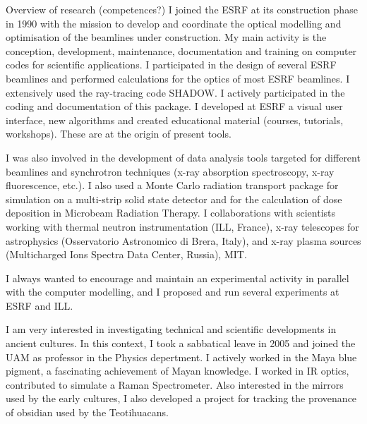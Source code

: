 \begin{rubric}{Overview of research (competences?)}
I joined the ESRF at its construction phase in 1990 with the mission to develop and coordinate the optical modelling and optimisation of the beamlines under construction.
My main activity is the conception, development, maintenance, documentation and training on
computer codes for scientific applications. I participated in the design of several ESRF beamlines and performed calculations for the optics of most ESRF beamlines.
I extensively used the ray-tracing code SHADOW. I actively participated in the coding and
documentation of this package. I developed at ESRF a visual user interface, new algorithms and
created educational material (courses, tutorials, workshops). These are at the origin of present tools.

I was also involved in the development of data analysis tools targeted for different beamlines and
synchrotron techniques (x-ray absorption spectroscopy, x-ray fluorescence, etc.). I also used a
Monte Carlo radiation transport package for simulation on a multi-strip solid state detector and for
the calculation of dose deposition in Microbeam Radiation Therapy.
I collaborations with scientists working with thermal neutron instrumentation (ILL, France),
x-ray telescopes for astrophysics (Osservatorio Astronomico di Brera, Italy), and x-ray plasma
sources (Multicharged Ions Spectra Data Center, Russia), MIT.

I always wanted to encourage and maintain an experimental activity in parallel with the computer
modelling, and I proposed and run several experiments at ESRF and ILL.

I am very interested in investigating technical and scientific developments in ancient cultures. In this context, I took a sabbatical leave in 2005 and joined the UAM as professor in the Physics depertment. I actively worked in the Maya blue pigment, a fascinating achievement of Mayan knowledge. I worked in IR optics, contributed to simulate a Raman Spectrometer. Also interested in the mirrors used by the early cultures, I also developed a project for tracking the provenance of obsidian used by the Teotihuacans.






\end{rubric}
